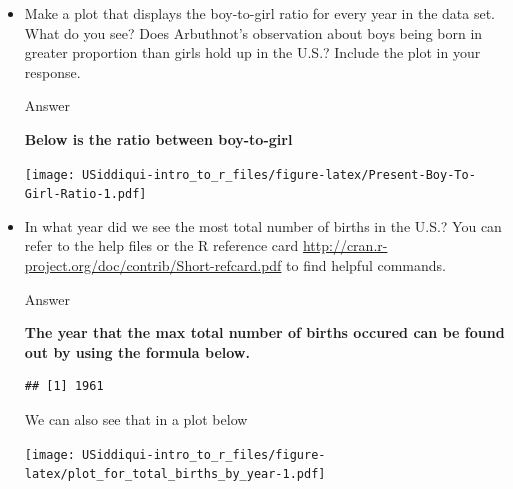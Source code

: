 \documentclass[
]{article}
\newenvironment{Shaded}{\begin{snugshade}}{\end{snugshade}}
\newcommand{\DataTypeTok}[1]{\textcolor[rgb]{0.13,0.29,0.53}{#1}}
\newcommand{\KeywordTok}[1]{\textcolor[rgb]{0.13,0.29,0.53}{\textbf{#1}}}
\newcommand{\NormalTok}[1]{#1}
\newcommand{\OperatorTok}[1]{\textcolor[rgb]{0.81,0.36,0.00}{\textbf{#1}}}
\newcommand{\StringTok}[1]{\textcolor[rgb]{0.31,0.60,0.02}{#1}}
\begin{document}
\begin{itemize}
\item
  Make a plot that displays the boy-to-girl ratio for every year in the
  data set. What do you see? Does Arbuthnot's observation about boys
  being born in greater proportion than girls hold up in the U.S.?
  Include the plot in your response.

  {Answer}

  \textbf{Below is the ratio between boy-to-girl}

\begin{Shaded}
\end{Shaded}

  \texttt{[image: USiddiqui-intro\_to\_r\_files/figure-latex/Present-Boy-To-Girl-Ratio-1.pdf]}
\item
  In what year did we see the most total number of births in the U.S.?
  You can refer to the help files or the R reference card
  \url{http://cran.r-project.org/doc/contrib/Short-refcard.pdf} to find
  helpful commands.

  {Answer}

  \textbf{The year that the max total number of births occured can be
  found out by using the formula below. }

\begin{Shaded}
\end{Shaded}

\begin{verbatim}
## [1] 1961
\end{verbatim}

  We can also see that in a plot below

\begin{Shaded}
\end{Shaded}

  \texttt{[image: USiddiqui-intro\_to\_r\_files/figure-latex/plot\_for\_total\_births\_by\_year-1.pdf]}
\end{itemize}
\end{document}
